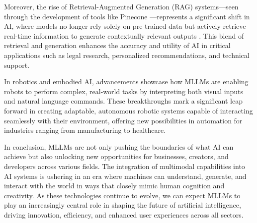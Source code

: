 Moreover, the rise of Retrieval-Augmented Generation (RAG) systems—seen through the development of tools like Pinecone \cite{johnson2021pinecone}—represents a significant shift in AI, where models no longer rely solely on pre-trained data but actively retrieve real-time information to generate contextually relevant outputs \cite{lewis2020retrieval}. This blend of retrieval and generation enhances the accuracy and utility of AI in critical applications such as legal research, personalized recommendations, and technical support.

In robotics and embodied AI, advancements showcase how MLLMs are enabling robots to perform complex, real-world tasks by interpreting both visual inputs and natural language commands. These breakthroughs mark a significant leap forward in creating adaptable, autonomous robotic systems capable of interacting seamlessly with their environment, offering new possibilities in automation for industries ranging from manufacturing to healthcare.

In conclusion, MLLMs are not only pushing the boundaries of what AI can achieve but also unlocking new opportunities for businesses, creators, and developers across various fields. The integration of multimodal capabilities into AI systems is ushering in an era where machines can understand, generate, and interact with the world in ways that closely mimic human cognition and creativity. As these technologies continue to evolve, we can expect MLLMs to play an increasingly central role in shaping the future of artificial intelligence, driving innovation, efficiency, and enhanced user experiences across all sectors.



